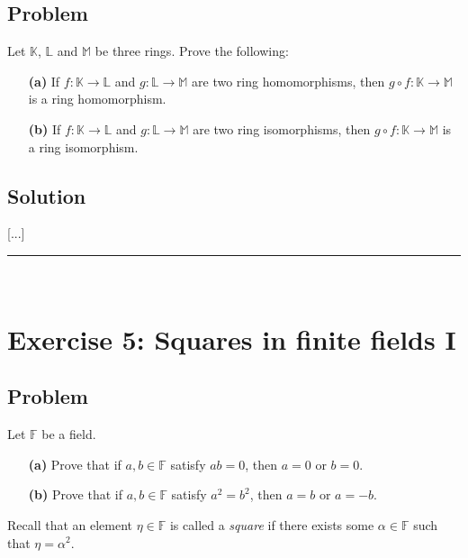 \documentclass[paper=a4, fontsize=12pt]{scrartcl} %
\newcommand{\KK}{\mathbb{K}} %
\newcommand{\LL}{\mathbb{L}} %
\newcommand{\MM}{\mathbb{M}} %
\newcommand{\FF}{\mathbb{F}} %
\newcommand{\horrule}[1]{\rule{\linewidth}{#1}} %
\theoremstyle{plainsl}
\theoremstyle{definition}
\theoremstyle{remark}
\begin{document}
\subsection{Problem}

Let $\KK$, $\LL$ and $\MM$ be three rings.
Prove the following:

\begin{enumerate}
\item[\textbf{(a)}] If $f : \KK \to \LL$ and $g : \LL \to \MM$
are two ring homomorphisms, then $g \circ f : \KK \to \MM$
is a ring homomorphism.

\item[\textbf{(b)}] If $f : \KK \to \LL$ and $g : \LL \to \MM$
are two ring isomorphisms, then $g \circ f : \KK \to \MM$
is a ring isomorphism.
\end{enumerate}

\subsection{Solution}

[...]

\horrule{0.3pt} \\[0.4cm]

\section{Exercise 5: Squares in finite fields I}

\subsection{Problem}

Let $\FF$ be a field.

\begin{enumerate}

\item[\textbf{(a)}] Prove that if $a, b \in \FF$ satisfy
$ab = 0$, then $a = 0$ or $b = 0$.

\item[\textbf{(b)}] Prove that if $a, b \in \FF$ satisfy
$a^2 = b^2$, then $a = b$ or $a = -b$.

\end{enumerate}

Recall that an element $\eta \in \FF$ is called a
\textit{square} if there exists some $\alpha \in \FF$
such that $\eta = \alpha^2$.
\end{document}
